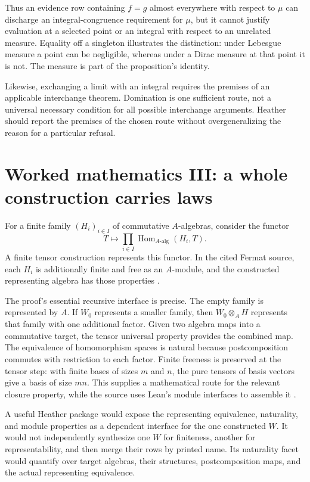 \documentclass[11pt,letterpaper]{article}
\theoremstyle{definition}\newtheorem{definition}[theorem]{Definition}
\theoremstyle{remark}\newtheorem{remark}[theorem]{Remark}
\begin{document}
Thus an evidence row containing $f=g$ almost everywhere with respect to $\mu$
can discharge an integral-congruence requirement for $\mu$, but it cannot
justify evaluation at a selected point or an integral with respect to an
unrelated measure. Equality off a singleton illustrates the distinction:
under Lebesgue measure a point can be negligible, whereas under a Dirac measure
at that point it is not. The measure is part of the proposition's identity.

Likewise, exchanging a limit with an integral requires the premises of an
applicable interchange theorem. Domination is one sufficient route, not a
universal necessary condition for all possible interchange arguments. Heather
should report the premises of the chosen route without overgeneralizing the
reason for a particular refusal.

\section{Worked mathematics III: a whole construction carries laws}\label{sec:tensor}

For a finite family $(H_i)_{i\in I}$ of commutative $A$-algebras, consider the
functor
\[
 T\longmapsto\prod_{i\in I}\operatorname{Hom}_{A\text{-alg}}(H_i,T).
\]
A finite tensor construction represents this functor. In the cited Fermat
source, each $H_i$ is additionally finite and free as an $A$-module, and the
constructed representing algebra has those properties \cite{tensor}.

The proof's essential recursive interface is precise. The empty family is
represented by $A$. If $W_0$ represents a smaller family, then
$W_0\otimes_A H$ represents that family with one additional factor. Given two
algebra maps into a commutative target, the tensor universal property provides
the combined map. The equivalence of homomorphism spaces is natural because
postcomposition commutes with restriction to each factor. Finite freeness is
preserved at the tensor step: with finite bases of sizes $m$ and $n$, the pure
tensors of basis vectors give a basis of size $mn$. This supplies a mathematical
route for the relevant closure property, while the source uses Lean's module
interfaces to assemble it \cite{tensor}.

A useful Heather package would expose the representing equivalence,
naturality, and module properties as a dependent interface for the one
constructed $W$. It would not independently synthesize one $W$ for finiteness,
another for representability, and then merge their rows by printed name.
Its naturality facet would quantify over target algebras, their structures,
postcomposition maps, and the actual representing equivalence.
\end{document}
